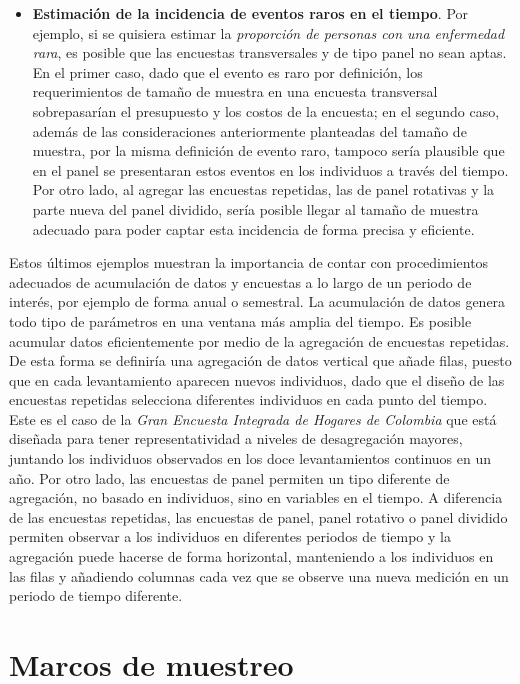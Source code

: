 \documentclass[12pt,spanish,]{book}
\begin{document}
\begin{itemize}
\item
  \textbf{Estimación de la incidencia de eventos raros en el tiempo}. Por ejemplo, si se quisiera estimar la \emph{proporción de personas con una enfermedad rara}, es posible que las encuestas transversales y de tipo panel no sean aptas. En el primer caso, dado que el evento es raro por definición, los requerimientos de tamaño de muestra en una encuesta transversal sobrepasarían el presupuesto y los costos de la encuesta; en el segundo caso, además de las consideraciones anteriormente planteadas del tamaño de muestra, por la misma definición de evento raro, tampoco sería plausible que en el panel se presentaran estos eventos en los individuos a través del tiempo. Por otro lado, al agregar las encuestas repetidas, las de panel rotativas y la parte nueva del panel dividido, sería posible llegar al tamaño de muestra adecuado para poder captar esta incidencia de forma precisa y eficiente.
\end{itemize}

Estos últimos ejemplos muestran la importancia de contar con procedimientos adecuados de acumulación de datos y encuestas a lo largo de un periodo de interés, por ejemplo de forma anual o semestral. La acumulación de datos genera todo tipo de parámetros en una ventana más amplia del tiempo. Es posible acumular datos eficientemente por medio de la agregación de encuestas repetidas. De esta forma se definiría una agregación de datos vertical que añade filas, puesto que en cada levantamiento aparecen nuevos individuos, dado que el diseño de las encuestas repetidas selecciona diferentes individuos en cada punto del tiempo. Este es el caso de la \emph{Gran Encuesta Integrada de Hogares de Colombia} que está diseñada para tener representatividad a niveles de desagregación mayores, juntando los individuos observados en los doce levantamientos continuos en un año. Por otro lado, las encuestas de panel permiten un tipo diferente de agregación, no basado en individuos, sino en variables en el tiempo. A diferencia de las encuestas repetidas, las encuestas de panel, panel rotativo o panel dividido permiten observar a los individuos en diferentes periodos de tiempo y la agregación puede hacerse de forma horizontal, manteniendo a los individuos en las filas y añadiendo columnas cada vez que se observe una nueva medición en un periodo de tiempo diferente.

\hypertarget{marcos-de-muestreo}{%
\chapter{Marcos de muestreo}\label{marcos-de-muestreo}}
\end{document}
